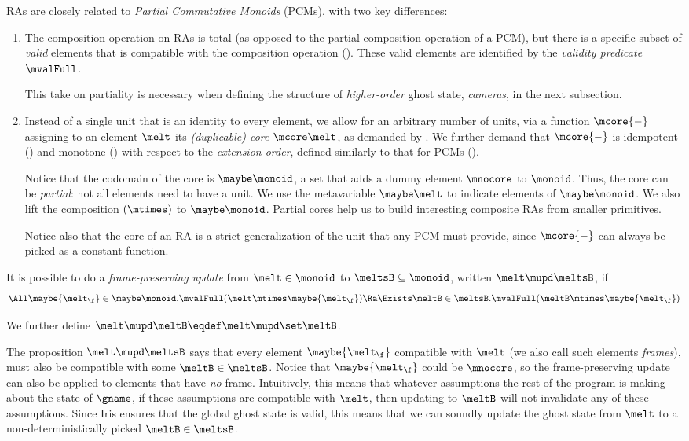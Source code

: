 RAs are closely related to \emph{Partial Commutative Monoids} (PCMs), with two key differences:
\begin{enumerate}
\item The composition operation on RAs is total (as opposed to the partial composition operation of a PCM), but there is a specific subset of \emph{valid} elements that is compatible with the composition operation ().
These valid elements are identified by the \emph{validity predicate} $\mvalFull$.

This take on partiality is necessary when defining the structure of \emph{higher-order} ghost state, \emph{cameras}, in the next subsection.

\item Instead of a single unit that is an identity to every element, we allow
for an arbitrary number of units, via a function $\mcore{{-}}$ assigning to an element $\melt$ its \emph{(duplicable) core} $\mcore\melt$, as demanded by .
  We further demand that $\mcore{{-}}$ is idempotent () and monotone () with respect to the \emph{extension order}, defined similarly to that for PCMs ().

  Notice that the codomain of the core is $\maybe\monoid$, a set that adds a dummy element $\mnocore$ to $\monoid$.
  Thus, the core can be \emph{partial}: not all elements need to have a unit.
  We use the metavariable $\maybe\melt$ to indicate elements of  $\maybe\monoid$.
  We also lift the composition $(\mtimes)$ to $\maybe\monoid$.
  Partial cores help us to build interesting composite RAs from smaller primitives.

Notice also that the core of an RA is a strict generalization of the unit that any PCM must provide, since $\mcore{{-}}$ can always be picked as a constant function.
\end{enumerate}


\begin{defn}
  It is possible to do a \emph{frame-preserving update} from $\melt \in \monoid$ to $\meltsB \subseteq \monoid$, written $\melt \mupd \meltsB$, if
  \[ \All \maybe{\melt_\f} \in \maybe\monoid. \mvalFull(\melt \mtimes \maybe{\melt_\f}) \Ra \Exists \meltB \in \meltsB. \mvalFull(\meltB \mtimes \maybe{\melt_\f}) \]

  We further define $\melt \mupd \meltB \eqdef \melt \mupd \set\meltB$.
\end{defn}
The proposition $\melt \mupd \meltsB$ says that every element $\maybe{\melt_\f}$ compatible with $\melt$ (we also call such elements \emph{frames}), must also be compatible with some $\meltB \in \meltsB$.
Notice that $\maybe{\melt_\f}$ could be $\mnocore$, so the frame-preserving update can also be applied to elements that have \emph{no} frame.
Intuitively, this means that whatever assumptions the rest of the program is making about the state of $\gname$, if these assumptions are compatible with $\melt$, then updating to $\meltB$ will not invalidate any of these assumptions.
Since Iris ensures that the global ghost state is valid, this means that we can soundly update the ghost state from $\melt$ to a non-deterministically picked $\meltB \in \meltsB$.

